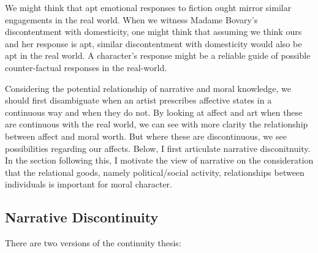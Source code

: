 \documentclass[phdthesis,12pt,final]{wuthesis}
\theoremstyle{definition}
\theoremstyle{definition}
\theoremstyle{definition}
\theoremstyle{definition}
\theoremstyle{remark}
\begin{document}
We might think that apt emotional responses to fiction ought mirror similar engagements in the real world. When we witness Madame Bovary's discontentment with domesticity, one might think that assuming we think ours and her response is apt, similar discontentment with domesticity would also be apt in the real world. A character's response might be a reliable guide of possible counter-factual responses in the real-world.

Considering the potential relationship of narrative and moral knowledge, we should first disambiguate when an artist prescribes affective states in a continuous way and when they do not. By looking at affect and art when these are continuous with the real world, we can see with more clarity the relationship between affect and moral worth. But where these are discontinuous, we see possibilities regarding our affects. Below, I first articulate narrative disconitnuity. In the section following this, I motivate the view of narrative on the consideration that the relational goods, namely political/social activity, relationships between individuals is important for moral character.

\subsection*{Narrative Discontinuity}\label{narrative-discontinuity}

There are two versions of the continuity thesis:

\begin{Shaded}
\begin{Highlighting}[]

\end{Highlighting}
\end{Shaded}

\begin{Shaded}
\begin{Highlighting}[]

\end{Highlighting}
\end{Shaded}
\end{document}
